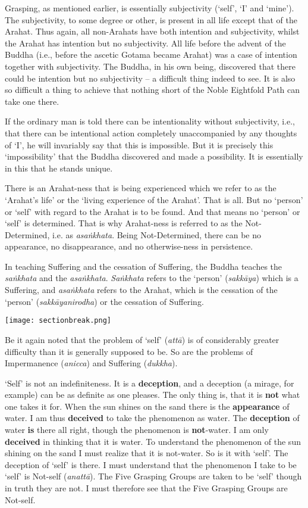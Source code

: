 Grasping, as mentioned earlier, is essentially subjectivity (`self', `I' and `mine'). The subjectivity, to some degree or other, is present in all life except that of the Arahat. Thus again, all non-Arahats have both intention and subjectivity, whilst the Arahat has intention but no subjectivity. All life before the advent of the Buddha (i.e., before the ascetic Gotama became Arahat) was a case of intention together with subjectivity. The Buddha, in his own being, discovered that there could be intention but no subjectivity -- a difficult thing indeed to see. It is also so difficult a thing to achieve that nothing short of the Noble Eightfold Path can take one there.

If the ordinary man is told there can be intentionality without subjectivity, i.e., that there can be intentional action completely unaccompanied by any thoughts of `I', he will invariably say that this is impossible. But it is precisely this `impossibility' that the Buddha discovered and made a possibility. It is essentially in this that he stands unique.

There is an Arahat-ness that is being experienced which we refer to as the `Arahat's life' or the `living experience of the Arahat'. That is all. But no `person' or `self' with regard to the Arahat is to be found. And that means no `person' or `self' is determined. That is why Arahat-ness is referred to as the Not-Determined, i.e. as \emph{asaṅkhata}. Being Not-Determined, there can be no appearance, no disappearance, and no otherwise-ness in persistence.

In teaching Suffering and the cessation of Suffering, the Buddha teaches the \emph{saṅkhata} and the \emph{asaṅkhata}. \emph{Saṅkhata} refers to the `person' (\emph{sakkāya}) which is a Suffering, and \emph{asaṅkhata} refers to the Arahat, which is the cessation of the `person' (\emph{sakkāyanirodha}) or the cessation of Suffering.

\texttt{[image: sectionbreak.png]}

Be it again noted that the problem of `self' (\emph{attā}) is of considerably greater difficulty than it is generally supposed to be. So are the problems of Impermanence (\emph{anicca}) and Suffering (\emph{dukkha}).

`Self' is not an indefiniteness. It is a \textbf{deception}, and a deception (a mirage, for example) can be as definite as one pleases. The only thing is, that it is \textbf{not} what one takes it for. When the sun shines on the sand there is the \textbf{appearance} of water. I am thus \textbf{deceived} to take the phenomenon as water. The \textbf{deception} of water \textbf{is} there all right, though the phenomenon is \textbf{not}-water. I am only \textbf{deceived} in thinking that it is water. To understand the phenomenon of the sun shining on the sand I must realize that it is not-water. So is it with `self'. The deception of `self' is there. I must understand that the phenomenon I take to be `self' is Not-self (\emph{anattā}). The Five Grasping Groups are taken to be `self' though in truth they are not. I must therefore see that the Five Grasping Groups are Not-self.

